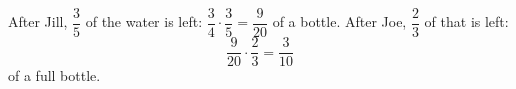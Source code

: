 After Jill, $\dfrac{3}{5}$ of the water is left: $\dfrac{3}{4}\cdot\dfrac{3}{5}=\dfrac{9}{20}$ of a bottle. After Joe, $\dfrac{2}{3}$ of that is left:
\[\dfrac{9}{20}\cdot\dfrac{2}{3}=\boxed{\dfrac{3}{10}}\]
of a full bottle.
